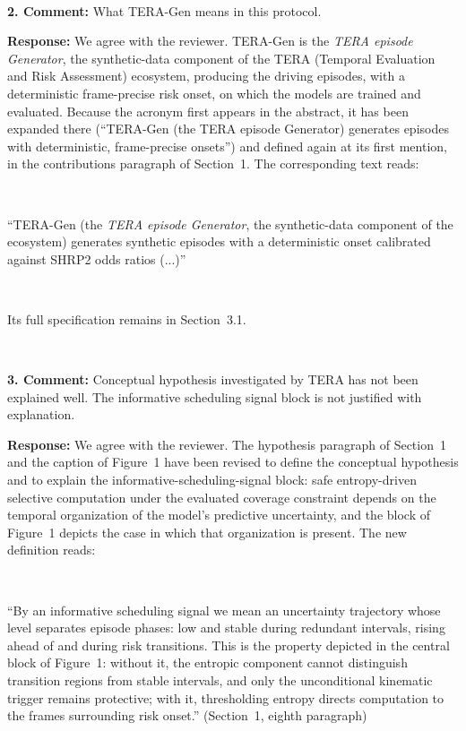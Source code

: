 \documentclass[1p,12pt,authoryear]{elsarticle}
\begin{document}
~

\noindent \textbf{2. Comment:} What TERA-Gen means in this protocol.

\vspace{2mm}
\noindent \textbf{Response:} We agree with the reviewer. TERA-Gen is the \emph{TERA episode Generator}, the synthetic-data component of the TERA (Temporal Evaluation and Risk Assessment) ecosystem, producing the driving episodes, with a deterministic frame-precise risk onset, on which the models are trained and evaluated. Because the acronym first appears in the abstract, it has been expanded there (``TERA-Gen (the TERA episode Generator) generates episodes with deterministic, frame-precise onsets'') and defined again at its first mention, in the contributions paragraph of Section~1. The corresponding text reads:

~

``TERA-Gen (the \emph{TERA episode Generator}, the synthetic-data component of the ecosystem) generates synthetic episodes with a deterministic onset calibrated against SHRP2 odds ratios (...)''

~

\noindent Its full specification remains in Section~3.1.

~

\noindent \textbf{3. Comment:} Conceptual hypothesis investigated by TERA has not been explained well. The informative scheduling signal block is not justified with explanation.

\vspace{2mm}
\noindent \textbf{Response:} We agree with the reviewer. The hypothesis paragraph of Section~1 and the caption of Figure~1 have been revised to define the conceptual hypothesis and to explain the informative-scheduling-signal block: safe entropy-driven selective computation under the evaluated coverage constraint depends on the temporal organization of the model's predictive uncertainty, and the block of Figure~1 depicts the case in which that organization is present. The new definition reads:

~

``By an informative scheduling signal we mean an uncertainty trajectory whose level separates episode phases: low and stable during redundant intervals, rising ahead of and during risk transitions. This is the property depicted in the central block of Figure~1: without it, the entropic component cannot distinguish transition regions from stable intervals, and only the unconditional kinematic trigger remains protective; with it, thresholding entropy directs computation to the frames surrounding risk onset.'' (Section~1, eighth paragraph)
\end{document}
